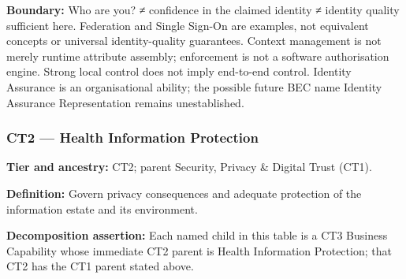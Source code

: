\textbf{Boundary:} Who are you? ≠ confidence in the claimed identity ≠ identity quality sufficient here. Federation and Single Sign-On are examples, not equivalent concepts or universal identity-quality guarantees. Context management is not merely runtime attribute assembly; enforcement is not a software authorisation engine. Strong local control does not imply end-to-end control. Identity Assurance is an organisational ability; the possible future BEC name Identity Assurance Representation remains unestablished.

\label{rad:business:787}
\subsubsection*{CT2 — Health Information Protection}
\label{rad:business:789}

\textbf{Tier and ancestry:} CT2; parent Security, Privacy \& Digital Trust (CT1).

\label{rad:business:791}

\textbf{Definition:} Govern privacy consequences and adequate protection of the information estate and its environment.

\label{rad:business:793}

\textbf{Decomposition assertion:} Each named child in this table is a CT3 Business Capability whose immediate CT2 parent is Health Information Protection; that CT2 has the CT1 parent stated above.

